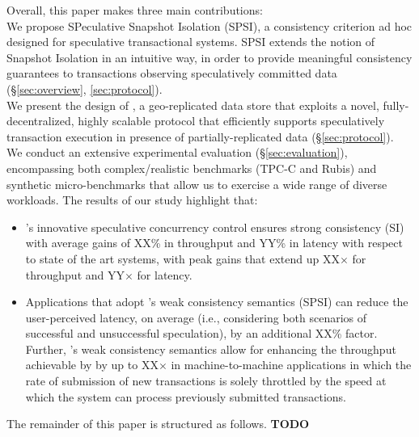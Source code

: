 Overall, this paper makes three main contributions:
~\\
 We propose SPeculative Snapshot Isolation (SPSI), a consistency criterion ad hoc designed for speculative transactional systems. SPSI extends the notion of Snapshot Isolation in an intuitive way, in order to provide meaningful consistency guarantees to transactions observing speculatively committed data (\S \ref{sec:overview}, \ref{sec:protocol}).
~\\
 We present the design of \specula, a  geo-replicated data store that exploits a novel, fully-decentralized, highly scalable protocol that efficiently supports speculatively transaction execution in presence of partially-replicated data  (\S \ref{sec:protocol}).
~\\
 We conduct an extensive experimental evaluation (\S \ref{sec:evaluation}),  encompassing both complex/realistic benchmarks (TPC-C and Rubis) and synthetic micro-benchmarks that allow us to exercise a wide range of diverse workloads. The results of our study highlight that:
\begin{itemize}
\item \specula's innovative speculative concurrency control ensures strong consistency (SI) with  average  gains of XX\% in throughput and YY\% in latency with respect to state of the art systems, with peak gains that extend up XX$\times$ for throughput and YY$\times$ for latency. 
\item Applications that adopt \specula's weak consistency semantics (SPSI) can reduce the user-perceived latency, on average  (i.e., considering both scenarios of successful and unsuccessful speculation), by an additional XX\% factor. Further, \specula's weak consistency semantics   allow for enhancing the throughput achievable by \specula by up to XX$\times$ in machine-to-machine applications in which the rate of submission of new transactions is solely throttled by the speed at which the system can process previously submitted transactions.
\end{itemize}

The remainder of this paper is structured as follows. {\bf TODO}

